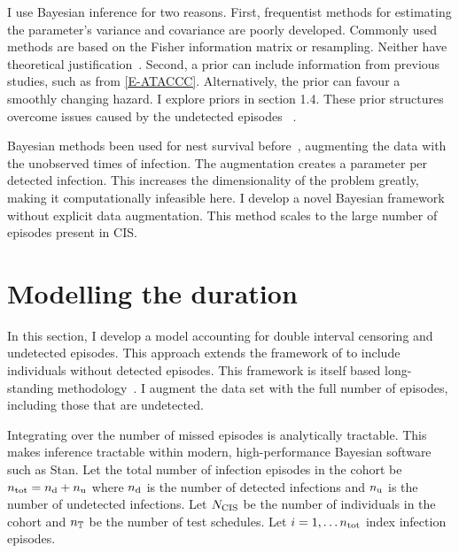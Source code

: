 \documentclass[thesis.tex]{subfiles}
\begin{document}
I use Bayesian inference for two reasons.
First, frequentist methods for estimating the parameter's variance and covariance are poorly developed.
Commonly used methods are based on the Fisher information matrix or resampling.
Neither have theoretical justification~\autocite[230]{sunAnalysis}.
Second, a prior can include information from previous studies, such as from \cref{E-ATACCC}.
Alternatively, the prior can favour a smoothly changing hazard.
I explore priors in section 1.4.
These prior structures overcome issues caused by the undetected episodes ~\autocite{caoBias}.

Bayesian methods been used for nest survival before~\autocite{heBayesiana,heBayesian,caoModeling}, augmenting the data with the unobserved times of infection.
The augmentation creates a parameter per detected infection.
This increases the dimensionality of the problem greatly, making it computationally infeasible here.
I develop a novel Bayesian framework without explicit data augmentation.
This method scales to the large number of episodes present in CIS.


\section{Modelling the duration}\label{perf-test:sec:model}

In this section, I develop a model accounting for double interval censoring and undetected episodes.
This approach extends the framework of \textcite{heiseyModelling} to include individuals without detected episodes.
This framework is itself based long-standing methodology~\autocite{dempsterMaximum,turnbullEmpirical}.
I augment the data set with the full number of episodes, including those that are undetected.

Integrating over the number of missed episodes is analytically tractable.
This makes inference tractable within modern, high-performance Bayesian software such as Stan.
Let the total number of infection episodes in the cohort be $n_\text{tot} = n_\text{d} + n_\text{u}$ where $n_\text{d}$ is the number of detected infections and $n_\text{u}$ is the number of undetected infections.
Let $N_\text{CIS}$ be the number of individuals in the cohort and $n_{\mathbb{T}}$ be the number of test schedules.
Let $i = 1, \dots n_\text{tot}$ index infection episodes.
\end{document}
